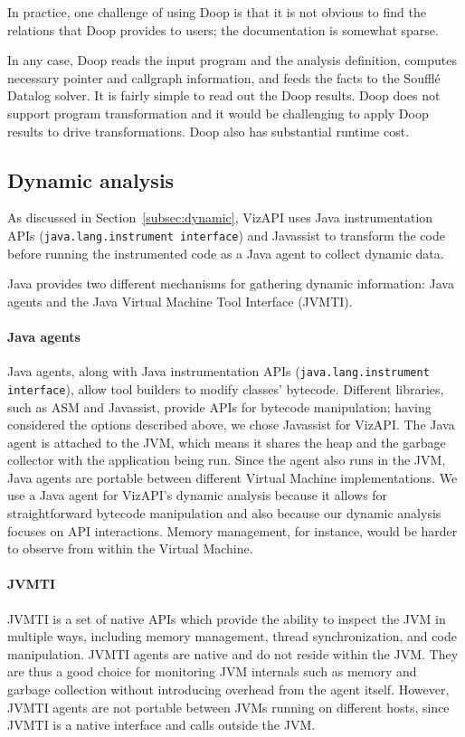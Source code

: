 In practice, one challenge of using Doop is that it is not obvious to find
the relations that Doop provides to users; the documentation is
somewhat sparse.

In any case, Doop reads the input program and the analysis definition,
computes necessary pointer and callgraph information, and feeds the
facts to the Soufflé Datalog solver. It is fairly simple to read out the
Doop results. Doop does not support program transformation and it would
be challenging to apply Doop results to drive transformations. Doop also
has substantial runtime cost.

\subsection{Dynamic analysis}
As discussed in Section~\ref{subsec:dynamic}, VizAPI uses Java instrumentation APIs (\texttt{java.lang.instrument interface}) and Javassist
to transform the code before running the instrumented code as a Java agent to collect
dynamic data.

Java provides two different mechanisms for gathering dynamic information: Java agents and the Java Virtual Machine Tool Interface (JVMTI).

\paragraph{Java agents}
Java agents, along with Java instrumentation APIs (\texttt{java.lang.instrument interface}), allow tool builders to modify classes' bytecode.
Different libraries, such as ASM and Javassist, provide APIs for bytecode manipulation; having considered the options described above, we chose Javassist for VizAPI.  
The Java agent is attached to the JVM, which means it shares the heap and the garbage collector with the application being run.
Since the agent also runs in the JVM, Java agents are portable between different Virtual Machine implementations.
We use a Java agent for VizAPI's dynamic analysis because it allows for straightforward bytecode manipulation 
and also because our dynamic analysis focuses on API interactions. Memory management, for instance, would be harder to observe from within the Virtual Machine.

\paragraph{JVMTI}
JVMTI is a set of native APIs which provide the ability to inspect the JVM in multiple ways, including memory management, 
thread synchronization, and code manipulation.
JVMTI agents are native and do not reside within the JVM. 
They are thus a good choice for monitoring JVM internals such as memory and garbage collection without introducing overhead from the agent itself.
However, JVMTI agents are not portable between JVMs running on different hosts, since JVMTI is a native interface and calls outside the JVM.

